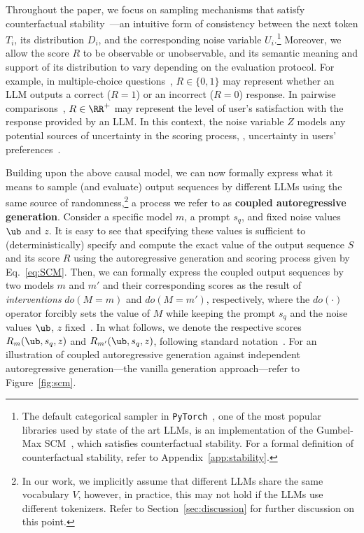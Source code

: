 Throughout the paper, we focus on sampling mechanisms that satisfy counterfactual stability~\citep{oberst2019counterfactual,tsirtsis2021counterfactual,chatzi2024counterfactual}---an intuitive form of consistency between the next token $T_i$, its distribution $D_i$, and the corresponding noise variable $U_i$.\footnote{The default categorical sampler in \texttt{PyTorch}~\citep{paszke2019pytorch}, one of the most popular libraries used by state of the art LLMs, is an implementation of the Gumbel-Max SCM~\citep{oberst2019counterfactual}, which satisfies counterfactual stability. 
For a formal definition of counterfactual stability, refer to Appendix~\ref{app:stability}.} 
%
Moreover, we allow the score $R$ to be observable or unobservable, and its semantic meaning and support of its distribution to vary depending on the evaluation protocol. For example, in multiple-choice questions~\citep{hendrycks2021measuring}, $R\in\{0,1\}$ may represent whether an LLM outputs a correct ($R=1$) or an incorrect ($R=0$) response. In pairwise comparisons~\citep{chiang2024chatbot}, $R\in\RR^+$ may represent the level of user'{}s satisfaction with the response provided by an LLM. 
%
In this context, the noise variable $Z$ models any potential sources of uncertainty in the scoring process, \eg, uncertainty in users' preferences~\citep{thurstone1927law,bradley1952rank,luce1959individual}.

Building upon the above causal model, we can now formally express what it means to sample (and evaluate) output sequences by different LLMs using the same source of randomness,\footnote{In our work, we implicitly assume that different LLMs share the same vocabulary $V$, however, in practice, this may not hold if the LLMs use different tokenizers. Refer to Section~\ref{sec:discussion} for further discussion on this point.} a process we refer to as {\bf coupled autoregressive generation}. 
%
Consider a specific model $m$, a prompt $s_q$, and fixed noise values $\ub$ and $z$. It is easy to see that specifying these values is sufficient to (deterministically) specify and compute the exact value of the output sequence $S$ and its score $R$ using the autoregressive generation and scoring process given by Eq.~\ref{eq:SCM}. 
%
Then, we can formally express the coupled output sequences by two models $m$ and $m'$ and their corresponding scores as the result of \emph{interventions} $do(M=m)$ and $do(M=m')$, respectively, where the $do(\cdot)$ operator forcibly sets the value of $M$ while keeping the prompt $s_q$ and the noise values $\ub$, $z$ fixed~\citep{pearl1994probabilistic}. 
% 
In what follows, we denote the respective scores $R_m (\ub, s_q, z)$ and $R_{m'} (\ub, s_q, z)$, following standard notation~\citep{pearl2009causality}.
% 
For an illustration of coupled autoregressive generation against independent autoregressive generation---the vanilla generation approach---refer to Figure~\ref{fig:scm}.

